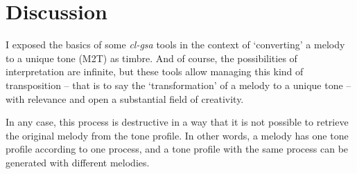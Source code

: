\section{Discussion}

I exposed the basics of some \textsl{cl-gsa} tools in the context of `converting' a melody to a unique tone (M2T) as timbre. And of course, the possibilities of interpretation are infinite, but these tools allow managing this kind of transposition -- that is to say the `transformation' of a melody to a unique tone -- with relevance and open a substantial field of creativity.

In any case, this process is destructive in a way that it is not possible to retrieve the original melody from the tone profile. In other words, a melody has one tone profile according to one process, and a tone profile with the same process can be generated with different melodies.